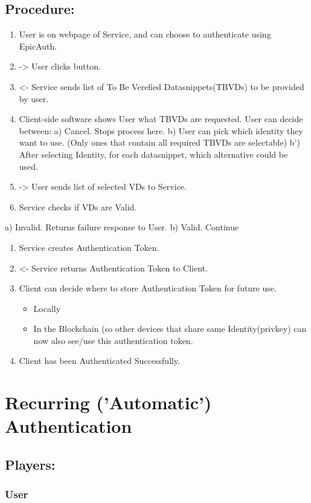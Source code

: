 \documentclass[11pt]{article}
\begin{document}
\subsection{Procedure:}
\label{sec:org835f90b}
\begin{enumerate}
\item User is on webpage of Service, and can choose to authenticate using EpicAuth.
\item -> User clicks button.
\item <- Service sends list of To Be Verefied Datasnippets(TBVDs) to be provided by user.
\item Client-side software shows User what TBVDs are requested. User can decide between:
a) Cancel. Stops process here.
b) User can pick which identity they want to use. (Only ones that contain all required TBVDs are selectable)
  b') After selecting Identity, for each datasnippet, which alternative could be used.
\item -> User sends list of selected VDs to Service.
\item Service checks if VDs are Valid.
\end{enumerate}
a) Invalid. Returns failure response to User.
b) Valid. Continue
\begin{enumerate}
\item Service creates Authentication Token.
\item <- Service returns Authentication Token to Client.
\item Client can decide where to store Authentication Token for future use.
\begin{itemize}
\item Locally
\item In the Blockchain (so other devices that share same Identity(privkey) can now also see/use this authentication token.
\end{itemize}
\item Client has been Authenticated Successfully.
\end{enumerate}

\section{Recurring ('Automatic') Authentication}
\label{sec:orgc966fea}
\subsection{Players:}
\label{sec:orge285d4e}
\subsubsection{User}
\label{sec:orgf90c0e2}
\end{document}
